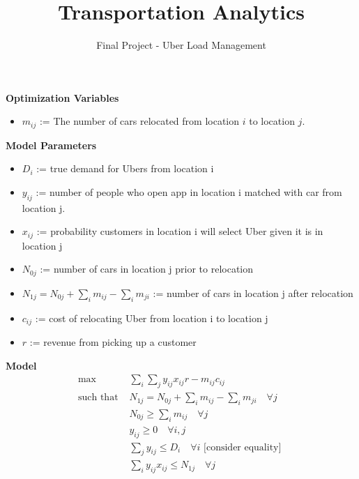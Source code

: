 \documentclass[12pt]{article}
\begin{document}
 
 
\title{Transportation Analytics}
\author{Final Project - Uber Load Management}

\maketitle

\textbf{Optimization Variables}

\begin{itemize}
\item $m_{ij}$ := The number of cars relocated from location $i$ to location $j$.
\end{itemize}

\vspace{.3 in}

\textbf{Model Parameters}
\begin{itemize}
\item $D_i$ := true demand for Ubers from location i
\item $y_{ij}$ := number of people who open app in location i matched with car from location j.
\item $x_{ij}$ := probability customers in location i will select Uber given it is in location j
\item $N_{0j}$ := number of cars in location j prior to relocation
\item $N_{1j} = N_{0j} + \sum_im_{ij} - \sum_im_{ji}$ := number of cars in location j after relocation
\item $c_{ij}$ := cost of relocating Uber from location i to location j
\item $r$ := revenue from picking up a customer
\end{itemize}

\vspace{.3 in}

\textbf{Model}
\begin{align*}
\max & \sum_i\sum_j y_{ij}x_{ij}r - m_{ij}c_{ij} \\
\text{such that      } & N_{1j} = N_{0j} + \sum_i m_{ij} - \sum_i m_{ji} \quad \forall j\\
& N_{0j}\geq \sum_i m_{ij} \quad \forall j \\
& y_{ij} \geq 0 \quad \forall i, j\\
& \sum_j y_{ij} \leq D_i \quad \forall i \text{   [consider equality]   }\\
& \sum_i y_{ij}x_{ij}\leq N_{1j} \quad \forall j
\end{align*}
\end{document}
